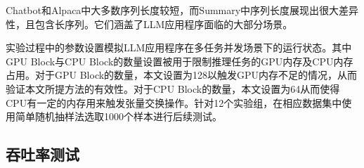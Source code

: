 Chatbot和Alpaca中大多数序列长度较短，而Summary中序列长度展现出很大差异性，且包含长序列。它们涵盖了LLM应用程序面临的大部分场景。

实验过程中的参数设置模拟LLM应用程序在多任务并发场景下的运行状态。其中GPU Block与CPU Block的数量设置被用于限制推理任务的GPU内存及CPU内存占用。对于GPU Block的数量，本文设置为128以触发GPU内存不足的情况，从而验证本文所提方法的有效性。对于CPU Block的数量，本文设置为64从而使得CPU有一定的内存用来触发张量交换操作。针对12个实验组，在相应数据集中使用简单随机抽样法选取1000个样本进行后续测试。







\subsection{吞吐率测试}

